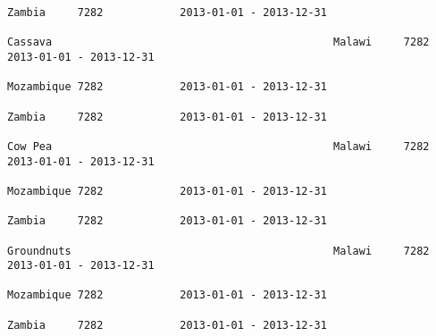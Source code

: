 \documentclass[11pt]{article}
\begin{document}
\begin{Verbatim}[commandchars=\\\{\}]
                                                                                                                                                                                                                 Zambia     7282            2013-01-01 - 2013-12-31   
                                                                                                                                                              Cassava                                            Malawi     7282            2013-01-01 - 2013-12-31   
                                                                                                                                                                                                                 Mozambique 7282            2013-01-01 - 2013-12-31   
                                                                                                                                                                                                                 Zambia     7282            2013-01-01 - 2013-12-31   
                                                                                                                                                              Cow Pea                                            Malawi     7282            2013-01-01 - 2013-12-31   
                                                                                                                                                                                                                 Mozambique 7282            2013-01-01 - 2013-12-31   
                                                                                                                                                                                                                 Zambia     7282            2013-01-01 - 2013-12-31   
                                                                                                                                                              Groundnuts                                         Malawi     7282            2013-01-01 - 2013-12-31   
                                                                                                                                                                                                                 Mozambique 7282            2013-01-01 - 2013-12-31   
                                                                                                                                                                                                                 Zambia     7282            2013-01-01 - 2013-12-31   

\end{Verbatim}
\end{document}
